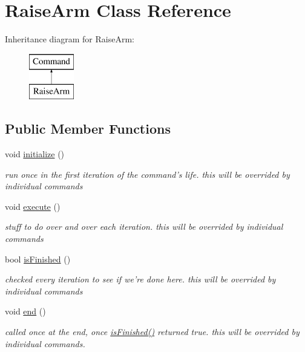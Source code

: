 \hypertarget{classRaiseArm}{\section{Raise\-Arm Class Reference}
\label{classRaiseArm}
}
Inheritance diagram for Raise\-Arm\-:\begin{figure}[H]
\begin{center}
\leavevmode
\includegraphics[height=2.000000cm]{classRaiseArm}
\end{center}
\end{figure}
\subsection*{Public Member Functions}
\begin{DoxyCompactItemize}
\item 
\hypertarget{classRaiseArm_a643abff446802bf06eb0141d3cad5ef4}{void \hyperlink{classRaiseArm_a643abff446802bf06eb0141d3cad5ef4}{initialize} ()}\label{classRaiseArm_a643abff446802bf06eb0141d3cad5ef4}

\begin{DoxyCompactList}\small\item\em run once in the first iteration of the command's life. this will be overrided by individual commands \end{DoxyCompactList}\item 
\hypertarget{classRaiseArm_a4e73ea27587532325bfea84e2fe72f62}{void \hyperlink{classRaiseArm_a4e73ea27587532325bfea84e2fe72f62}{execute} ()}\label{classRaiseArm_a4e73ea27587532325bfea84e2fe72f62}

\begin{DoxyCompactList}\small\item\em stuff to do over and over each iteration. this will be overrided by individual commands \end{DoxyCompactList}\item 
bool \hyperlink{classRaiseArm_a3f2f2806c7b255589864feae9322bbd1}{is\-Finished} ()
\begin{DoxyCompactList}\small\item\em checked every iteration to see if we're done here. this will be overrided by individual commands \end{DoxyCompactList}\item 
\hypertarget{classRaiseArm_a61c556ef1ca7e8c92970cec3baef933e}{void \hyperlink{classRaiseArm_a61c556ef1ca7e8c92970cec3baef933e}{end} ()}\label{classRaiseArm_a61c556ef1ca7e8c92970cec3baef933e}

\begin{DoxyCompactList}\small\item\em called once at the end, once \hyperlink{classRaiseArm_a3f2f2806c7b255589864feae9322bbd1}{is\-Finished()} returned true. this will be overrided by individual commands. \end{DoxyCompactList}\end{DoxyCompactItemize}
